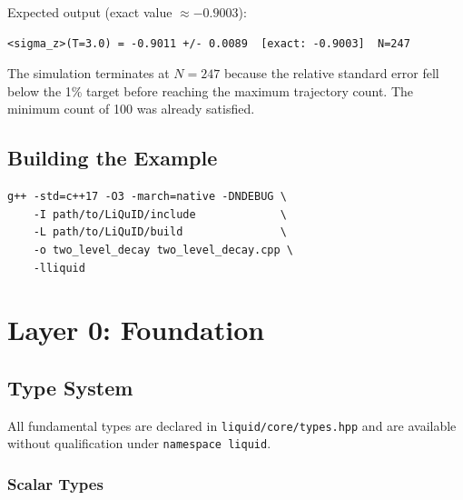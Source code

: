 \documentclass[11pt,a4paper,twoside]{book}
\newcommand{\code}[1]{\texttt{\small#1}}
\newcommand{\filename}[1]{\texttt{#1}}
\theoremstyle{definition}
\theoremstyle{remark}
\begin{document}
Expected output (exact value $\approx -0.9003$):

\begin{verbatim}
<sigma_z>(T=3.0) = -0.9011 +/- 0.0089  [exact: -0.9003]  N=247
\end{verbatim}

\begin{notebox}
  The simulation terminates at $N=247$ because the relative standard
  error fell below the 1\% target before reaching the maximum
  trajectory count. The minimum count of 100 was already satisfied.
\end{notebox}

\section{Building the Example}
\label{sec:build-example}

\begin{verbatim}
g++ -std=c++17 -O3 -march=native -DNDEBUG \
    -I path/to/LiQuID/include             \
    -L path/to/LiQuID/build               \
    -o two_level_decay two_level_decay.cpp \
    -lliquid
\end{verbatim}

\chapter{Layer 0: Foundation}
\label{chap:foundation}

\section{Type System}
\label{sec:types}

All fundamental types are declared in \filename{liquid/core/types.hpp}
and are available without qualification under \code{namespace liquid}.

\subsection{Scalar Types}
\label{subsec:scalar-types}
\end{document}
